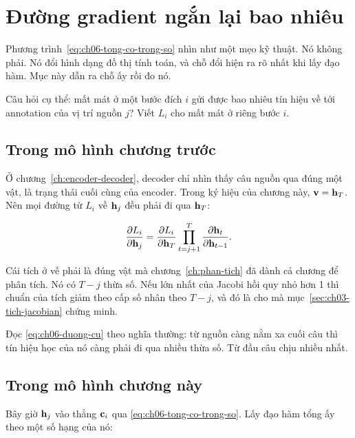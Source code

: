 \section{Đường gradient ngắn lại bao nhiêu}
\label{sec:ch06-duong-gradient}

%
Phương trình~\eqref{eq:ch06-tong-co-trong-so} nhìn như một mẹo kỹ thuật. Nó
không phải. Nó đổi hình dạng đồ thị tính toán, và chỗ đổi hiện ra rõ nhất khi
lấy đạo hàm. Mục này dẫn ra chỗ ấy rồi đo nó.

Câu hỏi cụ thể: mất mát ở một bước đích \(i\) gửi được bao nhiêu tín hiệu về
tới annotation của vị trí nguồn \(j\)? Viết \(L_i\) cho mất mát ở riêng bước
\(i\).

\subsection*{Trong mô hình chương trước}

%
Ở chương~\ref{ch:encoder-decoder}, decoder chỉ nhìn thấy câu nguồn qua đúng một
vật, là trạng thái cuối cùng của encoder. Trong ký hiệu của chương này,
\(\mathbf{v} = \mathbf{h}_{T}\). Nên mọi đường từ \(L_i\) về \(\mathbf{h}_j\) đều
phải đi qua \(\mathbf{h}_{T}\):

\begin{equation}
  \frac{\partial L_i}{\partial \mathbf{h}_j}
  = \frac{\partial L_i}{\partial \mathbf{h}_{T}} \prod_{t = j+1}^{T} \frac{\partial \mathbf{h}_t}{\partial \mathbf{h}_{t-1}}.
  \label{eq:ch06-duong-cu}
\end{equation}

Cái tích ở vế phải là đúng vật mà chương~\ref{ch:phan-tich} đã dành cả chương
để phân tích. Nó có \(T - j\) thừa số. Nếu 
lớn nhất của Jacobi hồi quy nhỏ hơn 1 thì chuẩn của tích giảm theo cấp số nhân
theo \(T - j\), và đó là  cho
 mà
mục~\ref{sec:ch03-tich-jacobian} chứng minh.

Đọc \eqref{eq:ch06-duong-cu} theo nghĩa thường: từ nguồn càng nằm xa cuối câu
thì tín hiệu học của nó càng phải đi qua nhiều thừa số. Từ đầu câu chịu nhiều
nhất.

\subsection*{Trong mô hình chương này}

%
Bây giờ \(\mathbf{h}_j\) vào thẳng \(\mathbf{c}_i\) qua
\eqref{eq:ch06-tong-co-trong-so}. Lấy đạo hàm tổng ấy theo một số hạng của nó:

